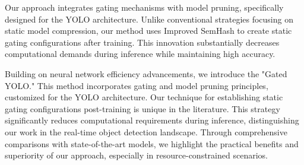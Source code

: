 Our approach integrates gating mechanisms with model pruning, specifically designed for the YOLO architecture. Unlike conventional strategies focusing on static model compression, our method uses Improved SemHash to create static gating configurations after training. This innovation substantially decreases computational demands during inference while maintaining high accuracy.

Building on neural network efficiency advancements, we introduce the "Gated YOLO." This method incorporates gating and model pruning principles, customized for the YOLO architecture. Our technique for establishing static gating configurations post-training is unique in the literature. This strategy significantly reduces computational requirements during inference, distinguishing our work in the real-time object detection landscape. Through comprehensive comparisons with state-of-the-art models, we highlight the practical benefits and superiority of our approach, especially in resource-constrained scenarios.


\clearpage
